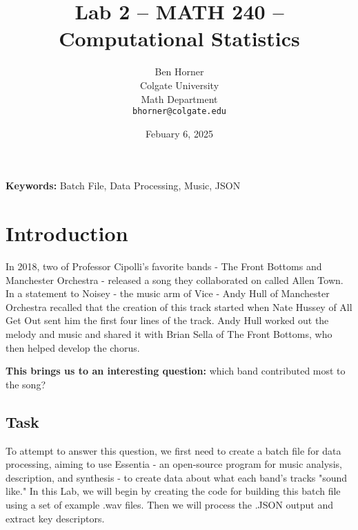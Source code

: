 \documentclass{article}\usepackage[]{graphicx}\usepackage[]{xcolor}
\begin{document}
\vspace{-1in}
\title{Lab 2 -- MATH 240 -- Computational Statistics}

\author{
  Ben Horner \\
  Colgate University  \\
  Math Department  \\
  {\tt bhorner@colgate.edu}
}

\date{Febuary 6, 2025}

\maketitle

\begin{multicols}{2}
\begin{abstract}

\end{abstract}

\noindent \textbf{Keywords:} Batch File, Data Processing, Music, JSON

\section{Introduction}
In 2018, two of Professor Cipolli's favorite bands - The Front Bottoms and Manchester Orchestra - released a song they collaborated on called Allen Town. In a statement to Noisey \citep{} -  the music arm of Vice - Andy Hull of Manchester Orchestra recalled that the creation of this track started when Nate Hussey of All Get Out sent him the first four lines of the track. Andy Hull worked out the melody and music and shared it with Brian Sella of The Front Bottoms, who then helped develop the chorus.

\textbf{This brings us to an interesting question:} which band contributed most to the song?
 
 
\subsection{Task}
  To attempt to answer this question, we first need to create a batch file for data processing, aiming to use Essentia - an open-source program for music analysis, description, and synthesis - to create data about what each band's tracks "sound like." In this Lab, we will begin by creating the code for building this batch file using a set of example .wav files. Then we will process the .JSON output and extract key descriptors.




\end{multicols}
\end{document}
